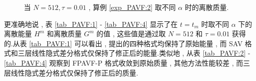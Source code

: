 \begin{figure}[H]
\begin{center}
{	%
	}
	\caption{当 $N = 512 , \tau=0.01$ , 算例 \ref{exp_PAVF:2} 取不同 $\alpha$ 时的离散质量.}
	 \label{fig_PAVF:4}
	\end{center}
	\end{figure}

	更准确地说 , 表 \ref{tab_PAVF:1} - \ref{tab_PAVF:4} 显示了在 $t=t_{m}$ 时取不同 $\alpha$ 下的离散能量 $H^{m}$ 和离散质量 $G^{m}$ 的值 , 
	这些值是通过取 $N=512$ 和 $\tau=0.01$ 获得的.从表 \ref{tab_PAVF:1} 可以看出 , 提出的四种格式均保持了原始能量 , 
	而 SAV 格式和三层线性隐式差分格式仅保持了修正后的能量.类似地 , 从表 \ref{tab_PAVF:2} - \ref{tab_PAVF:4} 观察到 FPAVF-P 格式收敛到原始质量 , 其他方法性能较差 , 而三层线性隐式差分格式仅保持了修正后的质量.

